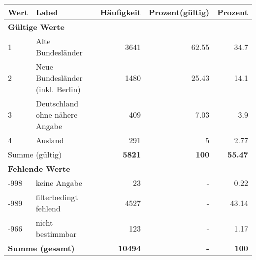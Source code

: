     \begin{longtable}{lXrrr}
     \toprule
     \textbf{Wert} & \textbf{Label} & \textbf{Häufigkeit} & \textbf{Prozent(gültig)} & \textbf{Prozent} \\
     \endhead
     \midrule
     \multicolumn{5}{l}{\textbf{Gültige Werte}}\\

     1 &
     \multicolumn{1}{X}{ Alte Bundesländer   } &


       \num{3641} &
       \num[round-mode=places,round-precision=2]{62.55} &
         \num[round-mode=places,round-precision=2]{34.7} \\

     2 &
     \multicolumn{1}{X}{ Neue Bundesländer (inkl. Berlin)   } &


       \num{1480} &
       \num[round-mode=places,round-precision=2]{25.43} &
         \num[round-mode=places,round-precision=2]{14.1} \\

     3 &
     \multicolumn{1}{X}{ Deutschland ohne nähere Angabe   } &


       \num{409} &
       \num[round-mode=places,round-precision=2]{7.03} &
         \num[round-mode=places,round-precision=2]{3.9} \\

     4 &
     \multicolumn{1}{X}{ Ausland   } &


       \num{291} &
       \num[round-mode=places,round-precision=2]{5} &
         \num[round-mode=places,round-precision=2]{2.77} \\
     \midrule
     \multicolumn{2}{l}{Summe (gültig)} &
       \textbf{\num{5821}} &
     \textbf{\num{100}} &
       \textbf{\num[round-mode=places,round-precision=2]{55.47}} \\
     \multicolumn{5}{l}{\textbf{Fehlende Werte}}\\
       -998 &
       keine Angabe &
         \num{23} &
        - &
         \num[round-mode=places,round-precision=2]{0.22} \\
       -989 &
       filterbedingt fehlend &
         \num{4527} &
        - &
         \num[round-mode=places,round-precision=2]{43.14} \\
       -966 &
       nicht bestimmbar &
         \num{123} &
        - &
         \num[round-mode=places,round-precision=2]{1.17} \\
     \midrule
     \multicolumn{2}{l}{\textbf{Summe (gesamt)}} &
          \textbf{\num{10494}} &
        \textbf{-} &
        \textbf{\num{100}} \\
     \bottomrule
     \end{longtable}
     
